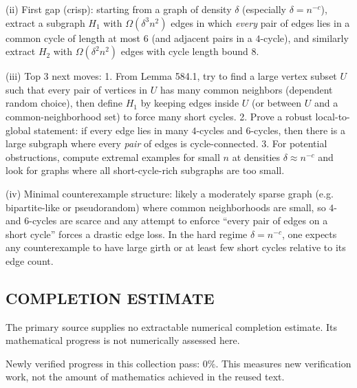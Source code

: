 (ii) First gap (crisp): starting from a graph of density $\delta$ (especially $\delta=n^{-c}$), extract a subgraph $H_1$ with $\Omega(\delta^3 n^2)$ edges in which \emph{every} pair of edges lies in a common cycle of length at most $6$ (and adjacent pairs in a $4$-cycle), and similarly extract $H_2$ with $\Omega(\delta^2 n^2)$ edges with cycle length bound $8$.

(iii) Top 3 next moves:
1. From Lemma 584.1, try to find a large vertex subset $U$ such that every pair of vertices in $U$ has many common neighbors (dependent random choice), then define $H_1$ by keeping edges inside $U$ (or between $U$ and a common-neighborhood set) to force many short cycles.
2. Prove a robust local-to-global statement: if every edge lies in many $4$-cycles and $6$-cycles, then there is a large subgraph where every \emph{pair} of edges is cycle-connected.
3. For potential obstructions, compute extremal examples for small $n$ at densities $\delta\approx n^{-c}$ and look for graphs where all short-cycle-rich subgraphs are too small.

(iv) Minimal counterexample structure: likely a moderately sparse graph (e.g. bipartite-like or pseudorandom) where common neighborhoods are small, so $4$- and $6$-cycles are scarce and any attempt to enforce ``every pair of edges on a short cycle'' forces a drastic edge loss. In the hard regime $\delta=n^{-c}$, one expects any counterexample to have large girth or at least few short cycles relative to its edge count.




\subsection*{COMPLETION ESTIMATE}
The primary source supplies no extractable numerical completion estimate. Its mathematical progress is not numerically assessed here.

Newly verified progress in this collection pass: $0\%$. This measures new verification work, not the amount of mathematics achieved in the reused text.
